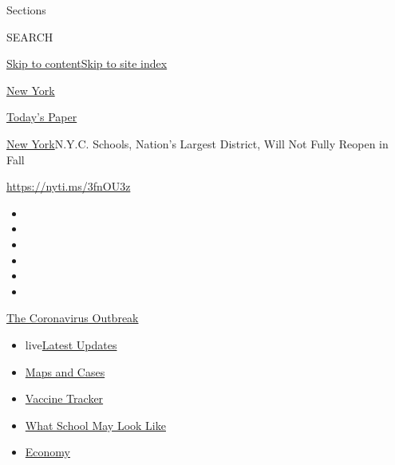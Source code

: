 Sections

SEARCH

\protect\hyperlink{site-content}{Skip to
content}\protect\hyperlink{site-index}{Skip to site index}

\href{https://www.nytimes.com/section/nyregion}{New York}

\href{https://myaccount.nytimes.com/auth/login?response_type=cookie\&client_id=vi}{}

\href{https://www.nytimes.com/section/todayspaper}{Today's Paper}

\href{/section/nyregion}{New York}\textbar{}N.Y.C. Schools, Nation's
Largest District, Will Not Fully Reopen in Fall

\url{https://nyti.ms/3fnOU3z}

\begin{itemize}
\item
\item
\item
\item
\item
\item
\end{itemize}

\href{https://www.nytimes.com/news-event/coronavirus?action=click\&pgtype=Article\&state=default\&region=TOP_BANNER\&context=storylines_menu}{The
Coronavirus Outbreak}

\begin{itemize}
\tightlist
\item
  live\href{https://www.nytimes.com/2020/08/01/world/coronavirus-covid-19.html?action=click\&pgtype=Article\&state=default\&region=TOP_BANNER\&context=storylines_menu}{Latest
  Updates}
\item
  \href{https://www.nytimes.com/interactive/2020/us/coronavirus-us-cases.html?action=click\&pgtype=Article\&state=default\&region=TOP_BANNER\&context=storylines_menu}{Maps
  and Cases}
\item
  \href{https://www.nytimes.com/interactive/2020/science/coronavirus-vaccine-tracker.html?action=click\&pgtype=Article\&state=default\&region=TOP_BANNER\&context=storylines_menu}{Vaccine
  Tracker}
\item
  \href{https://www.nytimes.com/interactive/2020/07/29/us/schools-reopening-coronavirus.html?action=click\&pgtype=Article\&state=default\&region=TOP_BANNER\&context=storylines_menu}{What
  School May Look Like}
\item
  \href{https://www.nytimes.com/live/2020/07/31/business/stock-market-today-coronavirus?action=click\&pgtype=Article\&state=default\&region=TOP_BANNER\&context=storylines_menu}{Economy}
\end{itemize}

